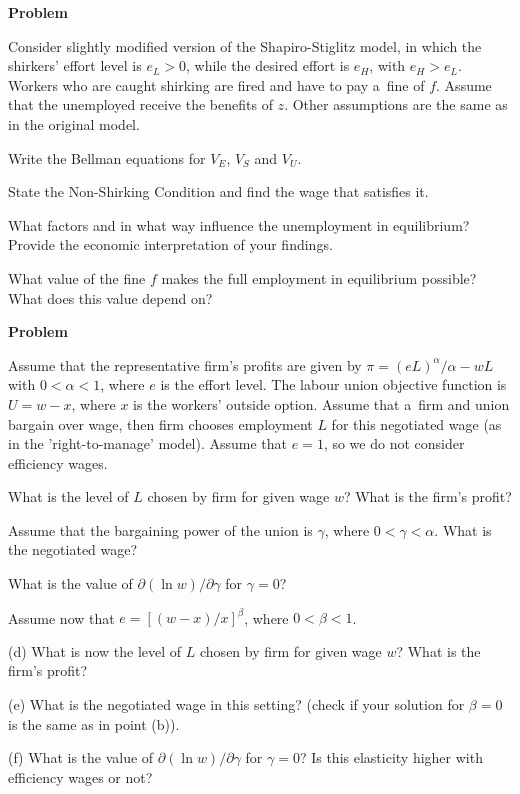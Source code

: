 \documentclass[a4paper, notitlepage, 11pt]{article}
\newcounter{zadlicz}[section]%
\newcommand{\tytul}[2]{\setcounter{equation}{0}\addtocounter{zadlicz}{1}\vspace{\abovedisplayskip}\noindent\textbf{#1\ \thezadlicz #2}}%
\begin{document}
\tytul{Problem}{}

\noindent%
Consider slightly modified version of the Shapiro-Stiglitz model, in which the shirkers' effort level is $e_L>0$, while the desired effort is $e_H$, with $e_H>e_L$. Workers who are caught shirking are fired and have to pay a~fine of $f$. Assume that the unemployed receive the benefits of $z$. Other assumptions are the same as in the original model.

\begin{wylicz}
\item Write the Bellman equations for $V_E$, $V_S$ and $V_U$.
\item State the Non-Shirking Condition and find the wage that satisfies it.
\item What factors and in what way influence the unemployment in equilibrium? Provide the economic interpretation of your findings.
\item What value of the fine $f$ makes the full employment in equilibrium possible? What does this value  depend on?
\end{wylicz}

\tytul{Problem}{}

\noindent%
Assume that the representative firm's profits are given by $\pi=(eL)^\alpha/\alpha-wL$ with $0<\alpha<1$, where $e$ is the effort level. The labour union objective function is $U=w-x$, where $x$ is the workers' outside option. Assume that a~firm and union bargain over wage, then firm chooses employment $L$ for this negotiated wage (as in the 'right-to-manage' model). Assume that $e=1$, so we do not consider efficiency wages.

\begin{wylicz}
 \item What is the level of $L$ chosen by firm for given wage $w$? What is the firm's profit?
 \item Assume that the bargaining power of the union is $\gamma$, where $0<\gamma<\alpha$. What is the negotiated wage?
 \item What is the value of $\partial (\ln w)/\partial\gamma$ for $\gamma=0$?
\end{wylicz}

Assume now that $e=[(w-x)/x]^\beta$, where $0<\beta<1$.

\begin{wylicz}
 \item[(d)] What is now the level of $L$ chosen by firm for given wage $w$? What is the firm's profit?
 \item[(e)] What is the negotiated wage in this setting? (check if your solution for $\beta=0$ is the same as in point (b)).
 \item[(f)] What is the value of $\partial (\ln w)/\partial\gamma$ for $\gamma=0$? Is this elasticity higher with efficiency wages or not?
\end{wylicz}
\end{document}
